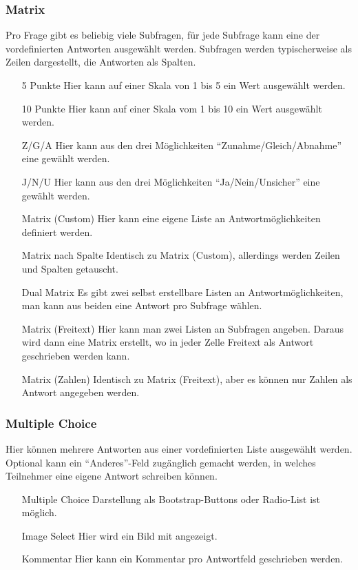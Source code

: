 \subsubsection{Matrix}

Pro Frage gibt es beliebig viele Subfragen, für jede Subfrage kann eine der vordefinierten Antworten ausgewählt werden.
Subfragen werden typischerweise als Zeilen dargestellt, die Antworten als Spalten.

\begin{itemize}
	\item[5 Punkte] Hier kann auf einer Skala von 1 bis 5 ein Wert ausgewählt werden.
	\item[10 Punkte] Hier kann auf einer Skala vom 1 bis 10 ein Wert ausgewählt werden.
	\item[Z/G/A] Hier kann aus den drei Möglichkeiten \enquote{Zunahme/Gleich/Abnahme} eine gewählt werden.
	\item[J/N/U] Hier kann aus den drei Möglichkeiten \enquote{Ja/Nein/Unsicher} eine gewählt werden.
	\item[Matrix (Custom)] Hier kann eine eigene Liste an Antwortmöglichkeiten definiert werden.
	\item[Matrix nach Spalte] Identisch zu Matrix (Custom), allerdings werden Zeilen und Spalten getauscht.
	\item[Dual Matrix] Es gibt zwei selbst erstellbare Listen an Antwortmöglichkeiten, man kann aus beiden eine Antwort pro Subfrage wählen.
	\item[Matrix (Freitext)] Hier kann man zwei Listen an Subfragen angeben. Daraus wird dann eine Matrix erstellt, wo in jeder Zelle Freitext als Antwort geschrieben werden kann.
	\item[Matrix (Zahlen)] Identisch zu Matrix (Freitext), aber es können nur Zahlen als Antwort angegeben werden.
\end{itemize}

\subsubsection{Multiple Choice}

Hier können mehrere Antworten aus einer vordefinierten Liste ausgewählt werden.
Optional kann ein \enquote{Anderes}-Feld zugänglich gemacht werden, in welches Teilnehmer eine eigene Antwort schreiben können.

\begin{itemize}
	\item[Multiple Choice] Darstellung als Bootstrap-Buttons oder Radio-List ist möglich.
	\item[Image Select] Hier wird ein Bild mit angezeigt.
	\item[Kommentar] Hier kann ein Kommentar pro Antwortfeld geschrieben werden.
\end{itemize}

